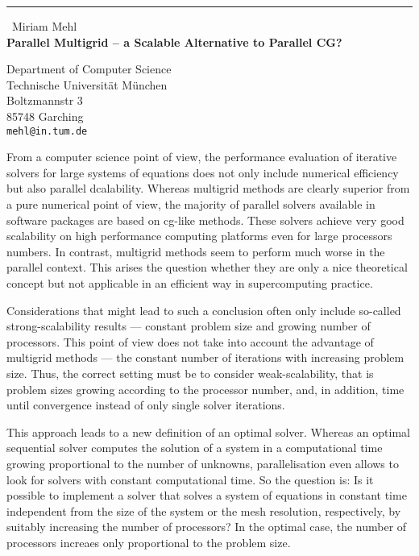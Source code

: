 \documentclass{report}
\begin{document}
\begin{center}
\rule{6in}{1pt} \
{\large Miriam Mehl \\
{\bf Parallel Multigrid -- a Scalable Alternative to Parallel CG?}}

Department of Computer Science \\ Technische Universit\"at M\"unchen \\ Boltzmannstr 3 \\ 85748 Garching
\\
{\tt mehl@in.tum.de}\end{center}

From a computer science point of view, the performance evaluation of
iterative solvers for large systems of equations
does not only include numerical efficiency but also parallel
dcalability. Whereas multigrid methods are clearly superior from
a pure numerical point of view, the majority of parallel solvers
available in software packages are
based on cg-like methods.
These solvers achieve very good scalability on high performance
computing platforms even for large processors numbers. In contrast,
multigrid methods seem to perform much worse in the parallel context.
This arises the question whether they are only a nice theoretical
concept but not applicable in an efficient way in supercomputing
practice.

Considerations that might lead to such a conclusion often only include
so-called strong-scalability results --- constant problem size and
growing number of processors.
This point of view does not take into account the advantage of
multigrid methods --- the constant number of iterations with
increasing problem size.
Thus, the correct setting must be to consider weak-scalability, that
is problem sizes growing according to the processor number, and, in
addition, time until convergence instead of only single solver
iterations.

This approach leads to a new definition of an optimal solver.
Whereas an optimal sequential
solver computes the solution of a system in a computational
time growing proportional to the number of unknowns,
parallelisation even allows to look for solvers with
constant computational time.
So the question is: Is it possible
to implement a solver that solves a system of equations in constant
time independent from the size of the system or the mesh resolution,
respectively, by suitably increasing the number of processors?
In the optimal case, the number of processors increaes only proportional
to the problem size.
\end{document}
